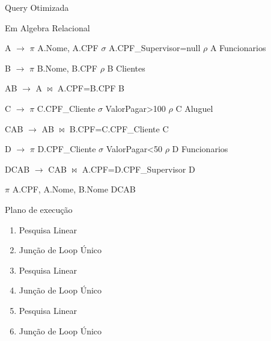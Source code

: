 \documentclass[aspectratio=169]{beamer}
\begin{document}
  \begin{frame}{Query Otimizada}

    Em Algebra Relacional
    \begin{flushleft}
      A $\rightarrow$ $\pi$ A.Nome, A.CPF $\sigma$ A.CPF\_Supervisor=null $\rho$ A Funcionarios 

      B $\rightarrow$ $\pi$ B.Nome, B.CPF $\rho$ B Clientes
 
      AB $\rightarrow$ A $\bowtie$ A.CPF=B.CPF B
 
      C $\rightarrow$ $\pi$ C.CPF\_Cliente $\sigma$ ValorPagar>100 $\rho$ C Aluguel
 
      CAB $\rightarrow$ AB $\bowtie$ B.CPF=C.CPF\_Cliente C
 
      D $\rightarrow$ $\pi$ D.CPF\_Cliente $\sigma$ ValorPagar<50 $\rho$ D Funcionarios 
 
      DCAB $\rightarrow$ CAB $\bowtie$ A.CPF=D.CPF\_Supervisor D
 
      $\pi$ A.CPF, A.Nome, B.Nome DCAB
    \end{flushleft}
  \end{frame}
  \begin{frame}{Plano de execução}
    
    \begin{enumerate}
      \item Pesquisa Linear 
      \item Junção de Loop Único
      \item Pesquisa Linear 
      \item Junção de Loop Único 
      \item Pesquisa Linear 
      \item Junção de Loop Único
    \end{enumerate}
  \end{frame}
\end{document}
